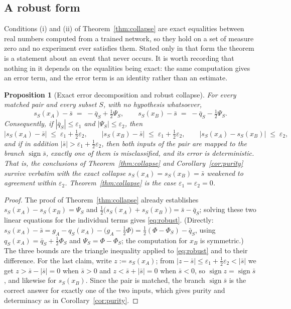 \documentclass[11pt,a4paper]{article}
\newtheorem{proposition}{Proposition}
\begin{document}
\subsection{A robust form}
\label{sec:robust}

Conditions (i) and (ii) of Theorem~\ref{thm:collapse} are exact equalities
between real numbers computed from a trained network, so they hold on a set of
measure zero and no experiment ever satisfies them. Stated only in that form
the theorem is a statement about an event that never occurs. It is worth
recording that nothing in it depends on the equalities being exact: the same
computation gives an error term, and the error term is an identity rather than
an estimate.

\begin{proposition}[Exact error decomposition and robust collapse]
\label{prop:robust}
For every matched pair and every subset $S$, with no hypothesis whatsoever,
\begin{equation}
\label{eq:robust}
s_S(x_A)-\bar s \;=\; -\bar q_S+\tfrac12\Psi_S,
\qquad
s_S(x_B)-\bar s \;=\; -\bar q_S-\tfrac12\Psi_S .
\end{equation}
Consequently, if $|\bar q_S|\le\varepsilon_1$ and $|\Psi_S|\le\varepsilon_2$,
then
\[
\bigl|s_S(x_A)-\bar s\bigr|\;\le\;\varepsilon_1+\tfrac12\varepsilon_2,
\qquad
\bigl|s_S(x_B)-\bar s\bigr|\;\le\;\varepsilon_1+\tfrac12\varepsilon_2,
\qquad
\bigl|s_S(x_A)-s_S(x_B)\bigr|\;\le\;\varepsilon_2 ,
\]
and if in addition $|\bar s|>\varepsilon_1+\tfrac12\varepsilon_2$, then both
inputs of the pair are mapped to the branch $\operatorname{sign}\bar s$,
exactly one of them is misclassified, and its error is deterministic. That is,
the conclusions of Theorem~\ref{thm:collapse} and Corollary~\ref{cor:purity}
survive verbatim with the exact collapse $s_S(x_A)=s_S(x_B)=\bar s$ weakened to
agreement within $\varepsilon_2$. Theorem~\ref{thm:collapse} is the case
$\varepsilon_1=\varepsilon_2=0$.
\end{proposition}

\begin{proof}
The proof of Theorem~\ref{thm:collapse} already establishes
$s_S(x_A)-s_S(x_B)=\Psi_S$ and
$\tfrac12\bigl(s_S(x_A)+s_S(x_B)\bigr)=\bar s-\bar q_S$; solving these two
linear equations for the individual terms gives \eqref{eq:robust}. (Directly:
$s_S(x_A)-\bar s=g_A-q_S(x_A)-\bigl(g_A-\tfrac12\Phi\bigr)
=\tfrac12(\Phi-\Phi_S)-\bar q_S$, using
$q_S(x_A)=\bar q_S+\tfrac12\Phi_S$ and $\Psi_S=\Phi-\Phi_S$; the computation
for $x_B$ is symmetric.) The three bounds are the triangle inequality applied
to \eqref{eq:robust} and to their difference. For the last claim, write
$z:=s_S(x_A)$; from $|z-\bar s|\le\varepsilon_1+\tfrac12\varepsilon_2<|\bar s|$
we get $z>\bar s-|\bar s|=0$ when $\bar s>0$ and $z<\bar s+|\bar s|=0$ when
$\bar s<0$, so $\operatorname{sign}z=\operatorname{sign}\bar s$, and likewise
for $s_S(x_B)$. Since the pair is matched, the branch
$\operatorname{sign}\bar s$ is the correct answer for exactly one of the two
inputs, which gives purity and determinacy as in
Corollary~\ref{cor:purity}.
\end{proof}
\end{document}

